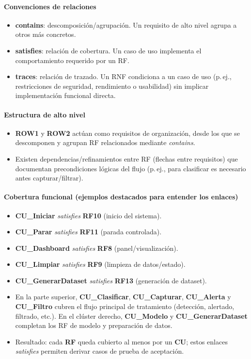 \paragraph{Convenciones de relaciones}
\begin{itemize}
  \item \textbf{contains}: descomposición/agrupación. Un requisito de alto nivel agrupa a otros más concretos.
  \item \textbf{satisfies}: relación de cobertura. Un caso de uso implementa el comportamiento requerido por un RF.
  \item \textbf{traces}: relación de trazado. Un RNF condiciona a un caso de uso (p.\,ej., restricciones de seguridad, rendimiento o usabilidad) sin implicar implementación funcional directa.
\end{itemize}

\paragraph{Estructura de alto nivel}
\begin{itemize}
  \item \textbf{ROW1} y \textbf{ROW2} actúan como requisitos de organización, desde los que se descomponen y agrupan RF relacionados mediante \emph{contains}.
  \item Existen dependencias/refinamientos entre RF (flechas entre requisitos) que documentan precondiciones lógicas del flujo (p.\,ej., para clasificar es necesario antes capturar/filtrar).
\end{itemize}

\paragraph{Cobertura funcional (ejemplos destacados para entender los enlaces)}
\begin{itemize}
  \item \textbf{CU\_Iniciar} \emph{satisfies} \textbf{RF10} (inicio del sistema).
  \item \textbf{CU\_Parar} \emph{satisfies} \textbf{RF11} (parada controlada).
  \item \textbf{CU\_Dashboard} \emph{satisfies} \textbf{RF8} (panel/visualización).
  \item \textbf{CU\_Limpiar} \emph{satisfies} \textbf{RF9} (limpieza de datos/estado).
  \item \textbf{CU\_GenerarDataset} \emph{satisfies} \textbf{RF13} (generación de dataset).
  \item En la parte superior, \textbf{CU\_Clasificar}, \textbf{CU\_Capturar}, \textbf{CU\_Alerta} y \textbf{CU\_Filtro} cubren el flujo principal de tratamiento (detección, alertado, filtrado, etc.). En el clúster derecho, \textbf{CU\_Modelo} y \textbf{CU\_GenerarDataset} completan los RF de modelo y preparación de datos.
  \item Resultado: cada \textbf{RF} queda cubierto al menos por un \textbf{CU}; estos enlaces \emph{satisfies} permiten derivar casos de prueba de aceptación.
\end{itemize}

